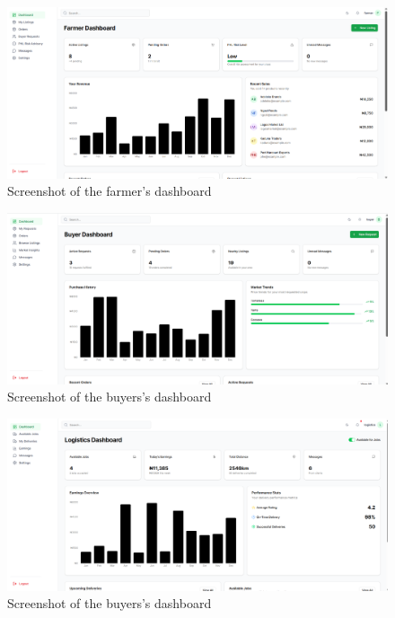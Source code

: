 {\begin{figure}[H]
    \centering
    \includegraphics[scale=0.3]{Figures/okra_mockup_farmer_db.png}
    \caption{Screenshot of the farmer's dashboard}
    \label{fig:figure-06}
\end{figure}


\begin{figure}[H]
    \centering
    \includegraphics[scale=0.3]{Figures/okra_mockup_buyer_db.png}
    \caption{Screenshot of the buyers's dashboard}
    \label{fig:figure-07}
\end{figure}

\begin{figure}[H]
    \centering
    \includegraphics[scale=0.3]{Figures/okra_mockup_logistics_db.png}
    \caption{Screenshot of the buyers's dashboard}
    \label{fig:figure-08}
\end{figure}


}
